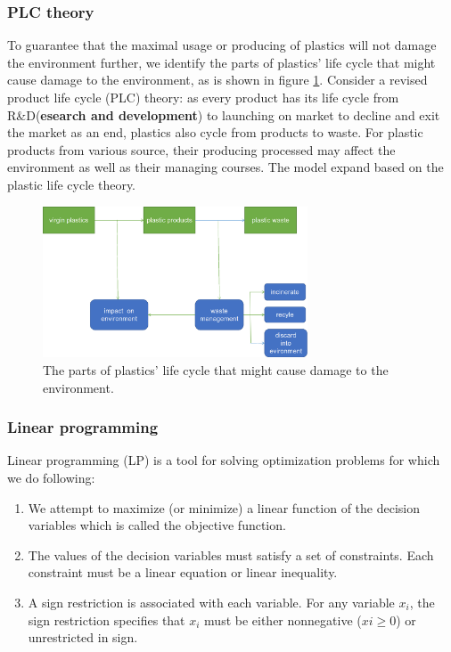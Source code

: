 \documentclass{mcmthesis}
\begin{document}
\subsubsection{PLC theory}

To guarantee that the maximal usage or producing of plastics will not damage the environment further, we identify the parts of plastics’ life cycle that might cause damage to the environment, as is shown in figure \ref{fig4}. Consider a revised product life cycle (PLC) theory: as every product has its life cycle from R\&D(\textbf{esearch and development}) to launching on market to decline and exit the market as an end, plastics also cycle from products to waste. For plastic products from various source, their producing processed may affect the environment as well as their managing courses. The model expand based on the plastic life cycle theory. 

\begin{figure}[!htb] %
	\centering %
	\includegraphics[width=0.7\textwidth]{figures/PCL.png} %
	\caption{The parts of plastics’ life cycle that might cause damage to the environment.} %
	\label{fig4} %
	
\end{figure}

\subsubsection{Linear programming}

Linear programming\cite{Hillier} (LP) is a tool for solving optimization problems for which we do following:

\begin{enumerate}
	\item We attempt to maximize (or minimize) a linear function of the decision variables which is called the objective function. 
	\item The values of the decision variables must satisfy a set of constraints. Each constraint must be a linear equation or linear inequality.
	\item A sign restriction is associated with each variable. For any variable $x_i$, the sign restriction specifies that $x_i$ must be either nonnegative ($xi \ge 0$) or unrestricted in sign.
\end{enumerate}
\end{document}
